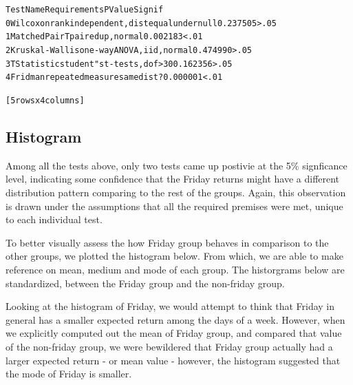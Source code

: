 \documentclass[letterpaper,10pt,english]{/Users/edwsurewin/anaconda/lib/python2.7/site-packages/sphinx/texinputs/sphinxhowto}
\newenvironment{InvisibleVerbatim}
        {\begin{mdframed}[leftmargin=0.1\linewidth,innerleftmargin=3pt,innerrightmargin=3pt, userdefinedwidth=1\linewidth, linewidth=0pt, linecolor=white, usetwoside=false]}
        {\end{mdframed}}
\begin{document}
    

        
        

            
                \begin{InvisibleVerbatim}
                \vspace{-0.5\baselineskip}
\begin{alltt}        Test Name                        Requirements   P Value Signif
0   Wilcoxon rank  independent, dist equal under null  0.237505   >.05
1  Matched Pair T                   paired up, normal  0.002183   <.01
2  Kruskal-Wallis          one-way ANOVA, iid, normal  0.474990   >.05
3     T Statistic         student"s t-tests, dof > 30  0.162356   >.05
4         Fridman         repeated measure same dist?  0.000001   <.01

[5 rows x 4 columns]
\end{alltt}

            \end{InvisibleVerbatim}
            
        
    
\subsection{Histogram}\label{histogram}

Among all the tests above, only two tests came up postivie at the 5\%
signficance level, indicating some confidence that the Friday returns
might have a different distribution pattern comparing to the rest of the
groups. Again, this observation is drawn under the assumptions that all
the required premises were met, unique to each individual test.

To better visually assess the how Friday group behaves in comparison to
the other groups, we plotted the histogram below. From which, we are
able to make reference on mean, medium and mode of each group. The
historgrams below are standardized, between the Friday group and the
non-friday group.

Looking at the histogram of Friday, we would attempt to think that
Friday in general has a smaller expected return among the days of a
week. However, when we explicitly computed out the mean of Friday group,
and compared that value of the non-friday group, we were bewildered that
Friday group actually had a larger expected return - or mean value -
however, the histogram suggested that the mode of Friday is smaller.
\end{document}
